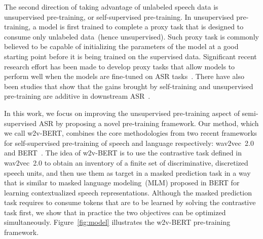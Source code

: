 \documentclass{article}
\begin{document}
The second direction of taking advantage of unlabeled speech data is unsupervised pre-training, or self-supervised pre-training.
In unsupervised pre-training, a model is first trained to complete a proxy task that is designed to consume only unlabeled data~(hence unsupervised).
Such proxy task is commonly believed to be capable of initializing the parameters of the model at a good starting point before it is being trained on the supervised data.
Significant recent research effort has been made to develop proxy tasks that allow models to perform well when the models are fine-tuned on ASR tasks~\cite{oord2018representation,chung2019unsupervised,schneider2019wav2vec,ling2020deep,chung2020generative,liu2020mockingjay,chung2020improved,liu2021tera,wang2020unsupervised,ling2020decoar,bai2021representation}.
There have also been studies that show that the gains brought by self-training and unsupervised pre-training are additive in downstream ASR~\cite{zhang2020pushing,xu2021self}.

In this work, we focus on improving the unsupervised pre-training aspect of semi-supervised ASR by proposing a novel pre-training framework.
Our method, which we call w2v-BERT, combines the core methodologies from two recent frameworks for self-supervised pre-training of speech and language respectively: wav2vec~2.0~\cite{baevski2020wav2vec} and BERT~\cite{devlin2019bert}.
The idea of w2v-BERT is to use the contrastive task defined in wav2vec~2.0 to obtain an inventory of a finite set of discriminative, discretized speech units, and then use them as target in a masked prediction task in a way that is similar to masked language modeling~(MLM) proposed in BERT for learning contextualized speech representations.
Although the masked prediction task requires to consume tokens that are to be learned by solving the contrastive task first, we show that in practice the two objectives can be optimized simultaneously.
Figure~\ref{fig:model} illustrates the w2v-BERT pre-training framework.
\end{document}
